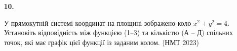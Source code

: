 \documentclass[14pt]{extarticle}
\newcommand{\nmtyear}[1]{\hfill{\small\color{yearcolor}(НМТ #1)}}
\begin{document}
\noindent\textbf{10.} \begin{minipage}[t]{0.55\textwidth}
У прямокутній системі координат на площині зображено коло $x^2+y^2=4$. Установіть відповідність між функцією (1–3) та кількістю (А – Д) спільних точок, які має графік цієї функції із заданим колом. \nmtyear{2023}
\end{minipage}
\hfill
\begin{minipage}[t]{0.4\textwidth}
    \vspace{-0.5cm}
    \begin{flushright}
    \end{flushright}
\end{minipage}

\vspace{0.3cm}
\end{document}

